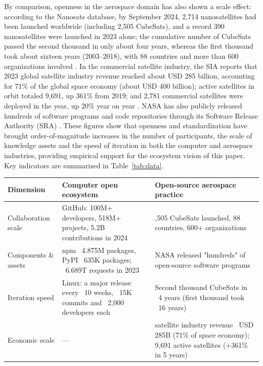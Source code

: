 \documentclass[11pt]{article}
\begin{document}
By comparison, openness in the aerospace domain has also shown a scale effect: according to the Nanosats database, by September 2024, 2,714 nanosatellites had been launched worldwide (including 2,505 CubeSats), and a record 390 nanosatellites were launched in 2023 alone; the cumulative number of CubeSats passed the second thousand in only about four years, whereas the first thousand took about sixteen years (2003--2018), with 88 countries and more than 600 organizations involved \cite{kulu2024}. In the commercial satellite industry, the SIA reports that 2023 global satellite industry revenue reached about USD 285 billion, accounting for 71\% of the global space economy (about USD 400 billion); active satellites in orbit totaled 9,691, up 361\% from 2019; and 2,781 commercial satellites were deployed in the year, up 20\% year on year \cite{sia2024}. NASA has also publicly released hundreds of software programs and code repositories through its Software Release Authority (SRA) \cite{nasa}. These figures show that openness and standardization have brought order-of-magnitude increases in the number of participants, the scale of knowledge assets and the speed of iteration in both the computer and aerospace industries, providing empirical support for the ecosystem vision of this paper. Key indicators are summarized in Table~\ref{tab:data}.

\begin{landscape}
\vfill
\centering
{}
\label{tab:data}
\begin{tabularx}{\textheight}{@{}>{\raggedright\arraybackslash}p{2.6cm}>{\raggedright\arraybackslash}X>{\raggedright\arraybackslash}X@{}}
\toprule
Dimension & Computer open ecosystem & Open-source aerospace practice \\
\midrule
Collaboration scale & GitHub: 100M+ developers, 518M+ projects, 5.2B contributions in 2024 \cite{octoverse2024} & 2,505 CubeSats launched, 88 countries, 600+ organizations \cite{kulu2024} \\
Components \& assets & npm ~4.875M packages, PyPI ~635K packages; ~6.689T requests in 2023 \cite{sonatype2024} & NASA released "hundreds" of open-source software programs \cite{nasa} \\
Iteration speed & Linux: a major release every ~10 weeks, ~15K commits and ~2,000 developers each \cite{lwn2023} & Second thousand CubeSats in ~4 years (first thousand took ~16 years) \cite{kulu2024} \\
Economic scale & --- & 2023 satellite industry revenue ~USD 285B (71\% of space economy); 9,691 active satellites (+361\% in 5 years) \cite{sia2024} \\
\bottomrule
\end{tabularx}
\vfill
\end{landscape}
\end{document}
